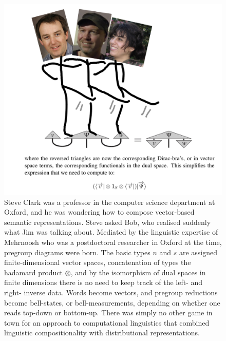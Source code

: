\begin{figure}[h!]
\includegraphics{figures/cartoons/disco1}
\caption{Steve Clark was a professor in the computer science department at Oxford, and he was wondering how to compose vector-based semantic representations. Steve asked Bob, who realised suddenly what Jim was talking about. Mediated by the linguistic expertise of Mehrnoosh who was a postdoctoral researcher in Oxford at the time, pregroup diagrams were born. The basic types $n$ and $s$ are assigned finite-dimensional vector spaces, concatenation of types the hadamard product $\otimes$, and by the isomorphism of dual spaces in finite dimensions there is no need to keep track of the left- and right- inverse data. Words become vectors, and pregroup reductions become bell-states, or bell-measurements, depending on whether one reads top-down or bottom-up. There was simply no other game in town for an approach to computational linguistics that combined linguistic compositionality with distributional representations.}
\end{figure}

